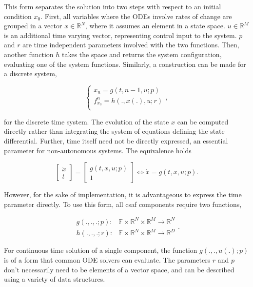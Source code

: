 This form separates the solution into two steps with respect to an initial condition $x_0$. First, all variables 
where the ODEs involve rates of change are grouped in a vector $x \in \mathbb R^N$, where it assumes an 
element in a state space. $u \in \mathbb R^M$ is an additional time varying vector, representing control input 
to the system. $p$ and $r$ are time independent parameters involved with the two functions. Then, another 
function $h$ takes the space and returns the system configuration, evaluating one of the system functions. 
Similarly, a construction can be made for a discrete system,

\begin{equation}
\begin{cases}
x_{n} = g(t, n-1, u; p)\\
f^{n}_{x_0} = h(., x(.), u; r) \\
\end{cases},
\end{equation}

for the discrete time system. The evolution of the state $x$ can be computed directly rather than integrating 
the system of equations defining the state differential. Further, time itself need not be directly expressed, an 
essential parameter for non-autonomous systems. The equivalence holds

\begin{equation}
\begin{bmatrix}
\dot x \\
t
\end{bmatrix} = 
\begin{bmatrix}
g(t, x, u; p) \\
1
\end{bmatrix} \iff \dot x = g(t, x, u;p) .
\end{equation}

However, for the sake of implementation, it is advantageous to express the time parameter directly. To use 
this form, all \acrshort{csaf}  components require two functions, 

\begin{equation}
\begin{aligned}
g(.,.,.;p):& \mathbb F \times \mathbb R^N \times \mathbb R^M \rightarrow \mathbb R^N \\
h(.,.,.;r):& \mathbb F \times \mathbb R^N \times \mathbb R^M \rightarrow \mathbb R^D
\end{aligned}.
\end{equation}

For continuous time solution of a single component, the function $g(.,.,u(.);p)$ is of a form that common ODE 
solvers can evaluate. The parameters $r$ and $p$ don't necessarily need to be elements of a vector space, 
and can be described using a variety of data structures.

